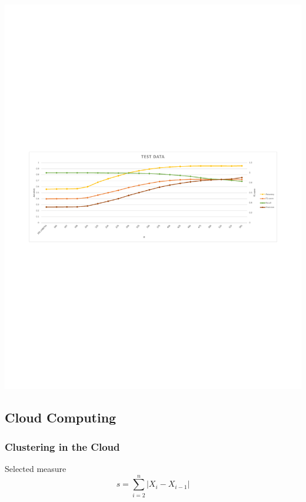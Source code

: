 \documentclass[xelatex,usenames,dvipsnames]{beamer}
\begin{document}
\begin{frame}[standout]
    \includegraphics[width = \textwidth]{figs/Edge_Test_Results.pdf}
  
  
  
    
  
  \end{frame}


  \subsection{Cloud Computing}
  \begin{frame}
    \frametitle{Clustering in the Cloud}
  
    \begin{exampleblock}{Selected measure}
      \begin{equation*}
        s = \sum_{i=2}^{n}{\left|X_i - X_{i-1}\right|}
      \end{equation*}
    \end{exampleblock}
  
  \end{frame}
\end{document}

